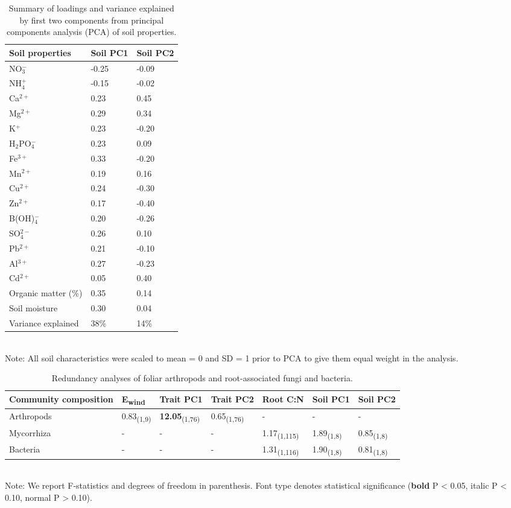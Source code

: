 \documentclass[11pt]{article}
\begin{document}
\begin{table} %
\centering
\caption{Summary of loadings and variance explained by first
two components from principal components analysis (PCA) of soil
properties.}
\label{TableS4}
\begin{tabular}{@{}lll@{}}
\toprule
Soil properties & Soil PC1 & Soil
PC2\tabularnewline
\midrule
NO$_3^-$ & -0.25 & -0.09\tabularnewline
NH$_4^+$ & -0.15 & -0.02\tabularnewline
Ca$^{2+}$ & 0.23 & 0.45\tabularnewline
Mg$^{2+}$ & 0.29 & 0.34\tabularnewline
K$^+$ & 0.23 & -0.20\tabularnewline
H$_2$PO$_4^-$ & 0.23 & 0.09\tabularnewline
Fe$^{3+}$ & 0.33 & -0.20\tabularnewline
Mn$^{2+}$ & 0.19 & 0.16\tabularnewline
Cu$^{2+}$ & 0.24 & -0.30\tabularnewline
Zn$^{2+}$ & 0.17 & -0.40\tabularnewline
B(OH)$_4^-$ & 0.20 & -0.26\tabularnewline
SO$_4^{2-}$ & 0.26 & 0.10\tabularnewline
Pb$^{2+}$ & 0.21 & -0.10\tabularnewline
Al$^{3+}$ & 0.27 & -0.23\tabularnewline
Cd$^{2+}$ & 0.05 & 0.40\tabularnewline
Organic matter (\%) & 0.35 & 0.14\tabularnewline
Soil moisture & 0.30 & 0.04\tabularnewline
Variance explained & 38\% & 14\%\tabularnewline
\bottomrule
\end{tabular}
\bigskip{}
\\
{\footnotesize Note: All soil characteristics were scaled to mean = 0 and SD = 1
prior to PCA to give them equal weight in the analysis.}
\end{table}

\begin{table} %
\centering
\caption{{Redundancy analyses of foliar arthropods and
root-associated fungi and bacteria.}}
\label{TableS5}
\begin{tabular}{@{}lllllll@{}}
\toprule
Community composition & E\textsubscript{wind} & Trait PC1 &
Trait PC2 & Root C:N & Soil PC1 &
Soil PC2\tabularnewline
\midrule
Arthropods & 0.83\textsubscript{(1,9)} & \textbf{12.05}\textsubscript{(1,76)} & 0.65\textsubscript{(1,76)} & - & - &
-\tabularnewline
Mycorrhiza & - & - & - & 1.17\textsubscript{(1,115)} & 1.89\textsubscript{(1,8)} &
0.85\textsubscript{(1,8)}\tabularnewline
Bacteria & - & - & - & 1.31\textsubscript{(1,116)} & 1.90\textsubscript{(1,8)} &
0.81\textsubscript{(1,8)}\tabularnewline
\bottomrule
\end{tabular}
\bigskip{}
\\
{\footnotesize Note: We report F-statistics and degrees
of freedom in parenthesis. Font type denotes statistical significance
(\textbf{bold} P \textless{} 0.05, italic P \textless{} 0.10, normal P
\textgreater{} 0.10).}
\end{table}
\end{document}
